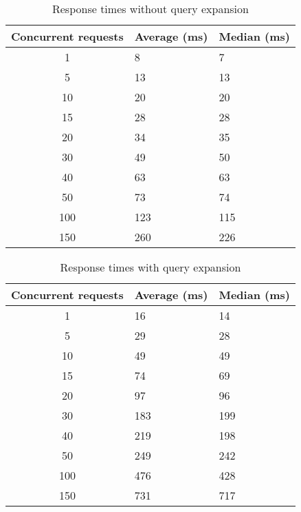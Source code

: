 \begin{table}[h]
    \centering
    \begin{tabular}{c|l|l}
    Concurrent requests & Average (ms) & Median (ms) \\ \hline
    1                   & 8            & 7           \\ \hline
    5                   & 13           & 13          \\ \hline
    10                  & 20           & 20          \\ \hline
    15                  & 28           & 28          \\ \hline
    20                  & 34           & 35          \\ \hline
    30                  & 49           & 50          \\ \hline
    40                  & 63           & 63          \\ \hline
    50                  & 73           & 74          \\ \hline
    100                 & 123          & 115         \\ \hline
    150                 & 260          & 226         \\ \hline
    \end{tabular}
    \caption{Response times without query expansion}
    \label{tbl:baseline}
\end{table}

\begin{table}[h]
    \centering
    \begin{tabular}{c|l|l}
     Concurrent requests & Average (ms) & Median (ms) \\ \hline
    1                    & 16           & 14          \\ \hline
    5                    & 29           & 28          \\ \hline
    10                   & 49           & 49          \\ \hline
    15                   & 74           & 69          \\ \hline
    20                   & 97           & 96          \\ \hline
    30                   & 183          & 199         \\ \hline
    40                   & 219          & 198         \\ \hline
    50                   & 249          & 242         \\ \hline
    100                  & 476          & 428         \\ \hline
    150                  & 731          & 717         \\ \hline
    \end{tabular}
    \caption{Response times with query expansion}
    \label{tbl:query-expansion}
\end{table}

